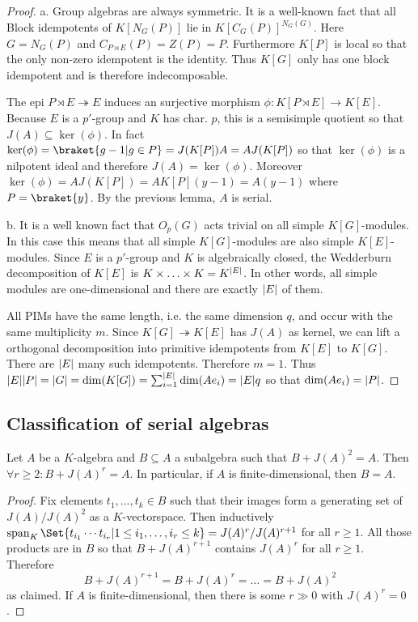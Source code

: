 \documentclass[fontsize=11pt,fleqn,a4paper]{scrartcl}
\begin{document}
\begin{proof}
a. Group algebras are always symmetric. It is a well-known fact that all Block idempotents of $K[N_G(P)]$ lie in $K[C_G(P)]^{N_G(G)}$. Here $G=N_G(P)$ and $C_{P\rtimes E}(P)=Z(P)=P$. Furthermore $K[P]$ is local so that the only non-zero idempotent is the identity. Thus $K[G]$ only has one block idempotent and is therefore indecomposable.

The epi $P\rtimes E\twoheadrightarrow E$ induces an surjective morphism $\phi: K[P\rtimes E] \to K[E]$. Because $E$ is a $p'$-group and $K$ has char. $p$, this is a semisimple quotient so that $J(A) \subseteq\ker(\phi)$. In fact $\ker(\phi) = \braket{g-1 | g\in P} = J(K[P])A=AJ(K[P])$ so that $\ker(\phi)$ is a nilpotent ideal and therefore $J(A) = \ker(\phi)$. Moreover $\ker(\phi)=AJ(K[P]) = AK[P](y-1) = A(y-1)$ where $P=\braket{y}$. By the previous lemma, $A$ is serial.

\medbreak
b. It is a well known fact that $O_p(G)$ acts trivial on all simple $K[G]$-modules. In this case this means that all simple $K[G]$-modules are also simple $K[E]$-modules. Since $E$ is a $p'$-group and $K$ is algebraically closed, the Wedderburn decomposition of $K[E]$ is $K \times \ldots \times K = K^{\lvert E\rvert}$. In other words, all simple modules are one-dimensional and there are exactly $\lvert E\rvert$ of them.

All PIMs have the same length, i.e. the same dimension $q$, and occur with the same multiplicity $m$. Since $K[G] \twoheadrightarrow K[E]$ has $J(A)$ as kernel, we can lift a orthogonal decomposition into primitive idempotents from $K[E]$ to $K[G]$. There are $\lvert E\rvert$ many such idempotents. Therefore $m=1$. Thus $\lvert E\rvert\lvert P\rvert = \lvert G\rvert = \dim(K[G]) = \sum_{i=1}^{\lvert E\rvert} \dim(Ae_i) = \lvert E\rvert q$ so that $\dim(Ae_i)=\lvert P\rvert$.
\end{proof}

\subsection{Classification of serial algebras}

\begin{lemma}
Let $A$ be a $K$-algebra and $B\subseteq A$ a subalgebra such that $B+J(A)^2 = A$. Then $\forall r\geq 2: B+J(A)^r = A$. In particular, if $A$ is finite-dimensional, then $B=A$.
\end{lemma}
\begin{proof}
Fix elements $t_1,\ldots,t_k\in B$ such that their images form a generating set of $J(A)/J(A)^2$ as a $K$-vectorspace. Then inductively $\operatorname{span}_K\Set{t_{i_1} \cdots t_{i_r} | 1\leq i_1,\ldots,i_r\leq k}= J(A)^r / J(A)^{r+1}$ for all $r\geq 1$. All those products are in $B$ so that $B+J(A)^{r+1}$ contains $J(A)^r$ for all $r\geq 1$. Therefore
\[B+J(A)^{r+1} = B+J(A)^r = \ldots = B+J(A)^2\]
as claimed. If $A$ is finite-dimensional, then there is some $r \gg 0$ with $J(A)^r=0$.
\end{proof}
\end{document}
